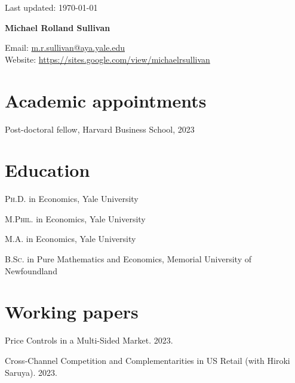 \documentclass[11pt]{article} %
\begin{document}
 \begin{flushright}
   \scriptsize
	Last updated: \today
   \normalsize
\end{flushright}
{\LARGE\bfseries Michael Rolland Sullivan} %
\bigskip\bigskip\medskip %

\medskip %

Email: \href{mailto:m.r.sullivan@yale.edu}{m.r.sullivan@aya.yale.edu}\\ 
Website: \href{https://sites.google.com/view/michaelrsullivan/home}{https://sites.google.com/view/michaelrsullivan}\\ 

%

\section*{Academic appointments}

Post-doctoral fellow, Harvard Business School, 2023

\section*{Education}

\textsc{Ph.D.} in Economics, Yale University  

\textsc{M.Phil.} in Economics, Yale University 

\textsc{M.A.} in Economics, Yale University 

\textsc{B.Sc.} in Pure Mathematics and Economics, Memorial University of Newfoundland

\section*{Working papers}

Price Controls in a Multi-Sided Market. 2023. 

\medskip

Cross-Channel Competition and Complementarities in US Retail
(with Hiroki Saruya). 2023.
\end{document}
